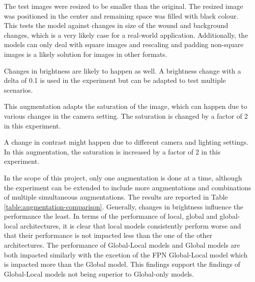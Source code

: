 \begin{description}[leftmargin=10px]
	\item[Embed] The test images were resized to be smaller than the original. The resized image was positioned in the center and remaining space was filled with black colour. This tests the model against changes in size of the wound and background changes, which is a very likely case for a real-world application. Additionally, the models can only deal with square images and rescaling and padding non-square images is a likely solution for images in other formats.
	\item[Brightness] Changes in brightness are likely to happen as well. A brightness change with a delta of 0.1 is used in the experiment but can be adapted to test multiple scenarios.
	\item[Saturation] This augmentation adapts the saturation of the image, which can happen due to various changes in the camera setting. The saturation is changed by a factor of 2 in this experiment.
	\item[Contrast] A change in contrast might happen due to different camera and lighting settings. In this augmentation, the saturation is increased by a factor of 2 in this experiment. 
\end{description}

In the scope of this project, only one augmentation is done at a time, although the experiment can be extended to include more augmentations and combinations of multiple simultaneous augmentations. The results are reported in Table \ref{table:augmentation-comparison}. Generally, changes in brightness influence the performance the least. In terms of the performance of local, global and global-local architectures, it is clear that local models consistently perform worse and that their performance is not impacted less than the one of the other architectures. The performance of Global-Local models and Global models are both impacted similarly with the excetion of the FPN Global-Local model which is impacted more than the Global model. This findings support the findings of Global-Local models not being superior to Global-only models.

